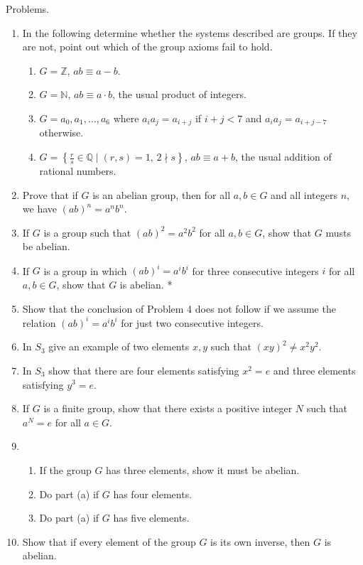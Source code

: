 \documentclass[twocolumn]{article}
\newcommand{\naturals}{\mathbb{N}}
\newcommand{\integers}{\mathbb{Z}}
\newcommand{\rationals}{\mathbb{Q}}
\begin{document}
Problems.
\begin{enumerate}
	\item
	In the following determine whether the systems described are groups. If they are not, point out which of the group axioms fail to hold.
	\begin{enumerate}
		\item
		$G = \integers$, $ab \equiv a - b$.
		\item
		$G = \naturals$, $ab \equiv a \cdot b$, the usual product of integers.
		\item
		$G = a_0, a_1, \ldots, a_6$ where $a_ia_j = a_{i + j}$ if $i + j < 7$ and $a_ia_j = a_{i + j - 7}$ otherwise.
		\item
		$G = \left\{ \frac{r}{s} \in \rationals \mid (r, s) = 1 \text{, } 2 \nmid s \right\}$, $ab \equiv a + b$, the usual addition of rational numbers.
	\end{enumerate}
	\item
	Prove that if $G$ is an abelian group, then for all $a, b \in G$ and all integers $n$, we have $(ab)^n = a^nb^n$.
	\item
	If $G$ is a group such that $(ab)^2 = a^2b^2$ for all $a, b \in G$, show that $G$ musts be abelian.
	\item
	If $G$ is a group in which $(ab)^i = a^ib^i$ for three consecutive integers $i$ for all $a, b \in G$, show that $G$ is abelian. *
	\item
	Show that the conclusion of Problem 4 does not follow if we assume the relation $(ab)^i = a^ib^i$ for just two consecutive integers.
	\item
	In $S_3$ give an example of two elements $x, y$ such that $(xy)^2 \neq x^2y^2$.
	\item
	In $S_3$ show that there are four elements satisfying $x^2 = e$ and three elements satisfying $y^3 = e$.
	\item
	If $G$ is a finite group, show that there exists a positive integer $N$ such that $a^N = e$ for all $a \in G$.
	\item
	\begin{enumerate}
		\item
		If the group $G$ has three elements, show it must be abelian.
		\item
		Do part (a) if $G$ has four elements.
		\item
		Do part (a) if $G$ has five elements.
	\end{enumerate}
	\item
	Show that if every element of the group $G$ is its own inverse, then $G$ is abelian.

\end{enumerate}
\end{document}
